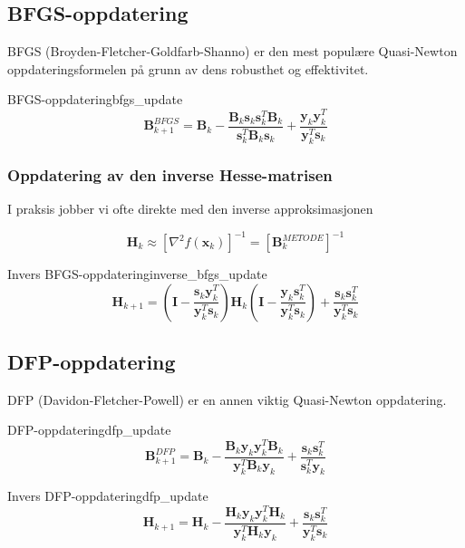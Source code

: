 \subsection{BFGS-oppdatering}
BFGS (Broyden-Fletcher-Goldfarb-Shanno) er den mest populære Quasi-Newton oppdateringsformelen på grunn av dens robusthet og effektivitet.

\begin{definition}{BFGS-oppdatering}{bfgs_update}
  \[
    \symbf{B}_{k+1}^{BFGS} = \symbf{B}_k - \frac{\symbf{B}_k\symbf{s}_k\symbf{s}_k^T\symbf{B}_k}{\symbf{s}_k^T\symbf{B}_k\symbf{s}_k} + \frac{\symbf{y}_k\symbf{y}_k^T}{\symbf{y}_k^T\symbf{s}_k}
  \]
\end{definition}

\subsubsection{Oppdatering av den inverse Hesse-matrisen}
I praksis jobber vi ofte direkte med den inverse approksimasjonen

\[
  \symbf{H}_k \approx [\nabla^2 f(\symbf{x}_k)]^{-1} =[\symbf{B}_k^{METODE}]^{-1}
\]

\begin{definition}{Invers BFGS-oppdatering}{inverse_bfgs_update}
  \[
    \symbf{H}_{k+1} = \left(\symbf{I} - \frac{\symbf{s}_k\symbf{y}_k^T}{\symbf{y}_k^T\symbf{s}_k}\right) \symbf{H}_k \left(\symbf{I} - \frac{\symbf{y}_k\symbf{s}_k^T}{\symbf{y}_k^T\symbf{s}_k}\right) + \frac{\symbf{s}_k\symbf{s}_k^T}{\symbf{y}_k^T\symbf{s}_k}
  \]
\end{definition}

\subsection{DFP-oppdatering}
DFP (Davidon-Fletcher-Powell) er en annen viktig Quasi-Newton oppdatering.

\begin{definition}{DFP-oppdatering}{dfp_update}
  \[
    \symbf{B}_{k+1}^{DFP} = \symbf{B}_k - \frac{\symbf{B}_k\symbf{y}_k\symbf{y}_k^T\symbf{B}_k}{\symbf{y}_k^T\symbf{B}_k\symbf{y}_k} + \frac{\symbf{s}_k\symbf{s}_k^T}{\symbf{s}_k^T\symbf{y}_k}
  \]
\end{definition}

\begin{definition}{Invers DFP-oppdatering}{dfp_update}
  \[
    \symbf{H}_{k+1} = \symbf{H}_k - \frac{\symbf{H}_k\symbf{y}_k\symbf{y}_k^T\symbf{H}_k}{\symbf{y}_k^T\symbf{H}_k\symbf{y}_k} + \frac{\symbf{s}_k\symbf{s}_k^T}{\symbf{y}_k^T\symbf{s}_k}
  \]
\end{definition}

